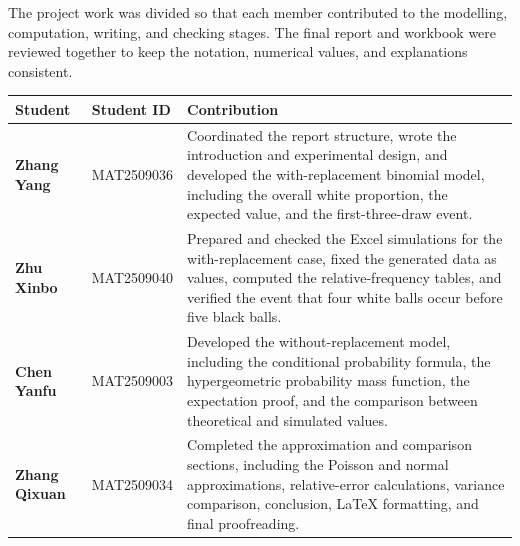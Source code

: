 \documentclass[12pt]{article}
\theoremstyle{definition}
\numberwithin{equation}{section}
\begin{document}
The project work was divided so that each member contributed to the modelling, computation, writing, and checking stages. The final report and workbook were reviewed together to keep the notation, numerical values, and explanations consistent.

\begin{tabularx}{\textwidth}{>{\bfseries}l l X}
\toprule
Student & Student ID & Contribution\\
\midrule
Zhang Yang & MAT2509036 & Coordinated the report structure, wrote the introduction and experimental design, and developed the with-replacement binomial model, including the overall white proportion, the expected value, and the first-three-draw event.\\
Zhu Xinbo & MAT2509040 & Prepared and checked the Excel simulations for the with-replacement case, fixed the generated data as values, computed the relative-frequency tables, and verified the event that four white balls occur before five black balls.\\
Chen Yanfu & MAT2509003 & Developed the without-replacement model, including the conditional probability formula, the hypergeometric probability mass function, the expectation proof, and the comparison between theoretical and simulated values.\\
Zhang Qixuan & MAT2509034 & Completed the approximation and comparison sections, including the Poisson and normal approximations, relative-error calculations, variance comparison, conclusion, LaTeX formatting, and final proofreading.\\
\bottomrule
\end{tabularx}
\end{document}
